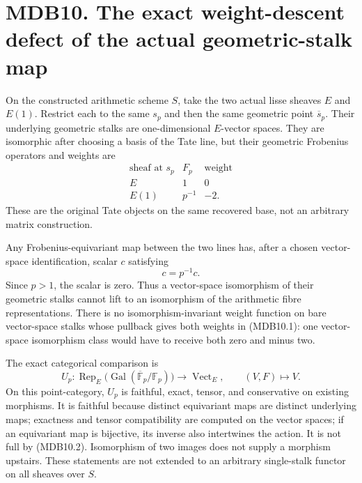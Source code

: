 \documentclass[
]{report}
\begin{document}
\section{MDB10. The exact weight-descent defect of the actual
geometric-stalk
map}\label{mdb10.-the-exact-weight-descent-defect-of-the-actual-geometric-stalk-map}

On the constructed arithmetic scheme \(S\), take the two actual lisse
sheaves \(E\) and \(E(1)\). Restrict each to the same \(s_p\) and then
the same geometric point \(\overline s_p\). Their underlying geometric
stalks are one-dimensional \(E\)-vector spaces. They are isomorphic
after choosing a basis of the Tate line, but their geometric Frobenius
operators and weights are \[
\begin{array}{c|c|c}
\text{sheaf at }s_p&F_p&\text{weight}\\
\hline
E&1&0\\
E(1)&p^{-1}&-2 .
\end{array}
\tag{MDB10.1}
\] These are the original Tate objects on the same recovered base, not
an arbitrary matrix construction.

Any Frobenius-equivariant map between the two lines has, after a chosen
vector-space identification, scalar \(c\) satisfying \[
c=p^{-1}c.
\tag{MDB10.2}
\] Since \(p>1\), the scalar is zero. Thus a vector-space isomorphism of
their geometric stalks cannot lift to an isomorphism of the arithmetic
fibre representations. There is no isomorphism-invariant weight function
on bare vector-space stalks whose pullback gives both weights in
(MDB10.1): one vector-space isomorphism class would have to receive both
zero and minus two.

The exact categorical comparison is \[
U_p:\operatorname{Rep}_{E}\bigl(\operatorname{Gal}
(\overline{\mathbb F}_p/\mathbb F_p)\bigr)
\longrightarrow\operatorname{Vect}_{E},\qquad
(V,F)\longmapsto V.
\tag{MDB10.3}
\] On this point-category, \(U_p\) is faithful, exact, tensor, and
conservative on existing morphisms. It is faithful because distinct
equivariant maps are distinct underlying maps; exactness and tensor
compatibility are computed on the vector spaces; if an equivariant map
is bijective, its inverse also intertwines the action. It is not full by
(MDB10.2). Isomorphism of two images does not supply a morphism
upstairs. These statements are not extended to an arbitrary single-stalk
functor on all sheaves over \(S\).
\end{document}
